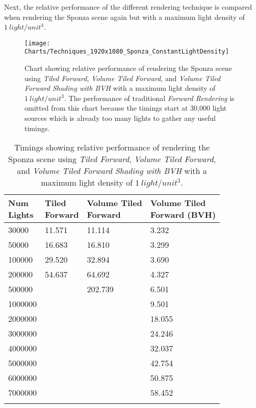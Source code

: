 Next, the relative performance of the different rendering technique is compared when rendering the Sponza scene again but with a maximum light density of $1~light/unit^3$.

\begin{figure}[H]
\centering
\texttt{[image: Charts/Techniques\_1920x1080\_Sponza\_ConstantLightDensity]}
\decoRule
\caption{Chart showing relative performance of rendering the Sponza scene using \emph{Tiled Forward}, \emph{Volume Tiled Forward}, and \emph{Volume Tiled Forward Shading with BVH} with a maximum light density of $1~light/unit^3$. The performance of traditional \emph{Forward Rendering} is omitted from this chart because the timings start at 30,000 light sources which is already too many lights to gather any useful timings. }
\label{fig:Techniques_1920x1080_Sponza_ConstantLightDensity}
\end{figure}


\begin{table}[H]
\caption{Timings showing relative performance of rendering the Sponza scene using \emph{Tiled Forward}, \emph{Volume Tiled Forward}, and \emph{Volume Tiled Forward Shading with BVH} with a maximum light density of $1~light/unit^3$. }
\label{tab:Techniques_1920x1080_Sponza}
\centering
\begin{tabular}{*{4}{l}}
\toprule
\thead{Num \\Lights} & \thead{Tiled \\Forward} & \thead{Volume Tiled \\Forward} & \thead{Volume Tiled \\Forward (BVH)} \\
\midrule
30000 & 11.571 & 11.114 & 3.232 \\
50000 & 16.683 & 16.810 & 3.299 \\
100000 & 29.520 & 32.894 & 3.690 \\
200000 & 54.637 & 64.692 & 4.327 \\
500000 &  & 202.739 & 6.501 \\
1000000 &  &  & 9.501 \\
2000000 &  &  & 18.055 \\
3000000 &  &  & 24.246 \\
4000000 &  &  & 32.037 \\
5000000 &  &  & 42.754 \\
6000000 &  &  & 50.875 \\
7000000 &  &  & 58.452 \\
\bottomrule\\
\end{tabular}
\end{table}

